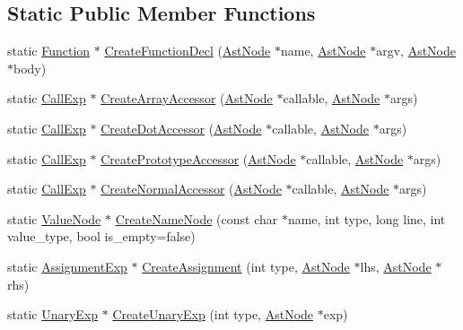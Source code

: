 \subsection*{Static Public Member Functions}
\begin{DoxyCompactItemize}
\item 
static \hyperlink{classmocha_1_1_function}{Function} $\ast$ \hyperlink{classmocha_1_1_ast_utils_a2b150de7953f29e5c94c7e9d110a6d97}{CreateFunctionDecl} (\hyperlink{classmocha_1_1_ast_node}{AstNode} $\ast$name, \hyperlink{classmocha_1_1_ast_node}{AstNode} $\ast$argv, \hyperlink{classmocha_1_1_ast_node}{AstNode} $\ast$body)
\item 
static \hyperlink{classmocha_1_1_call_exp}{CallExp} $\ast$ \hyperlink{classmocha_1_1_ast_utils_a73682172af76ec16a106911d7546180f}{CreateArrayAccessor} (\hyperlink{classmocha_1_1_ast_node}{AstNode} $\ast$callable, \hyperlink{classmocha_1_1_ast_node}{AstNode} $\ast$args)
\item 
static \hyperlink{classmocha_1_1_call_exp}{CallExp} $\ast$ \hyperlink{classmocha_1_1_ast_utils_aed7efcb40804b8b9e3740a49519fa41a}{CreateDotAccessor} (\hyperlink{classmocha_1_1_ast_node}{AstNode} $\ast$callable, \hyperlink{classmocha_1_1_ast_node}{AstNode} $\ast$args)
\item 
static \hyperlink{classmocha_1_1_call_exp}{CallExp} $\ast$ \hyperlink{classmocha_1_1_ast_utils_ac0986e9863d2cba6b3cbae21c9f3cea2}{CreatePrototypeAccessor} (\hyperlink{classmocha_1_1_ast_node}{AstNode} $\ast$callable, \hyperlink{classmocha_1_1_ast_node}{AstNode} $\ast$args)
\item 
static \hyperlink{classmocha_1_1_call_exp}{CallExp} $\ast$ \hyperlink{classmocha_1_1_ast_utils_a77bd4f7ca31be505683055685aa1ff77}{CreateNormalAccessor} (\hyperlink{classmocha_1_1_ast_node}{AstNode} $\ast$callable, \hyperlink{classmocha_1_1_ast_node}{AstNode} $\ast$args)
\item 
static \hyperlink{classmocha_1_1_value_node}{ValueNode} $\ast$ \hyperlink{classmocha_1_1_ast_utils_a1a4ad629469bdb21a0b4b67023c416f1}{CreateNameNode} (const char $\ast$name, int type, long line, int value\_\-type, bool is\_\-empty=false)
\item 
static \hyperlink{classmocha_1_1_assignment_exp}{AssignmentExp} $\ast$ \hyperlink{classmocha_1_1_ast_utils_a3cd4b28daba962ddd963eec4bffc9f84}{CreateAssignment} (int type, \hyperlink{classmocha_1_1_ast_node}{AstNode} $\ast$lhs, \hyperlink{classmocha_1_1_ast_node}{AstNode} $\ast$rhs)
\item 
static \hyperlink{classmocha_1_1_unary_exp}{UnaryExp} $\ast$ \hyperlink{classmocha_1_1_ast_utils_a25e8d20ae483db57a4b5c51d0444b5a7}{CreateUnaryExp} (int type, \hyperlink{classmocha_1_1_ast_node}{AstNode} $\ast$exp)

\end{DoxyCompactItemize}
